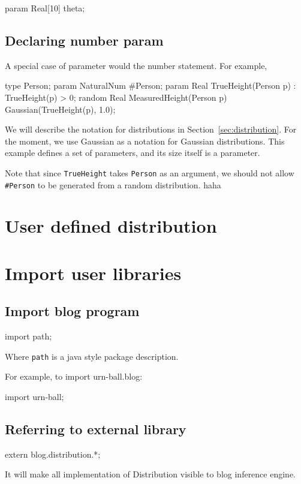 \documentclass[12pt]{article}
\begin{document}
{\begin{blogcode}
param Real[10] theta;
\end{blogcode}

\subsection{Declaring number param}
A special case of parameter would the number statement. For example,
\begin{blogcode}
type Person;
param NaturalNum #Person;
param Real TrueHeight(Person p) : TrueHeight(p) > 0;
random Real MeasuredHeight(Person p) ~ Gaussian(TrueHeight(p), 1.0);
\end{blogcode}
We will describe the notation for distributions in Section~\ref{sec:distribution}. For the moment, we use Gaussian as a notation for Gaussian distributions.
This example defines a set of parameters, and its size itself is a parameter.

Note that since \texttt{TrueHeight} takes \texttt{Person} as an argument, we should not allow \texttt{\#Person} to be generated from a random distribution.
haha

\section{User defined distribution}

\section{Import user libraries}
\subsection{Import blog program}
\begin{blogcode}
import path;
\end{blogcode}
Where \texttt{path} is a java style package description.

For example, to import urn-ball.blog:
\begin{blogcode}
import urn-ball;
\end{blogcode}

\subsection{Referring to external library}
\begin{blogcode}
extern blog.distribution.*;
\end{blogcode}
It will make all implementation of Distribution visible to blog inference engine.


}
\end{document}
